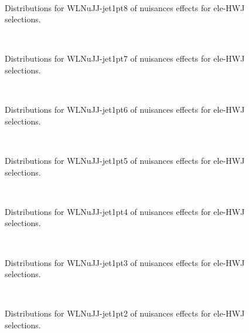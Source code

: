 \begin{figure}[htbp]  
\centering 
\\ 
\caption{ 
   Distributions for WLNuJJ-jet1pt8 of nuisances effects for ele-HWJ selections.
} 
\label{fig:WLNuJJ_jet1pt8_ele_HWJ} 
\end{figure} 




\begin{figure}[htbp]  
\centering 
\\ 
\caption{ 
   Distributions for WLNuJJ-jet1pt7 of nuisances effects for ele-HWJ selections.
} 
\label{fig:WLNuJJ_jet1pt7_ele_HWJ} 
\end{figure} 




\begin{figure}[htbp]  
\centering 
\\ 
\caption{ 
   Distributions for WLNuJJ-jet1pt6 of nuisances effects for ele-HWJ selections.
} 
\label{fig:WLNuJJ_jet1pt6_ele_HWJ} 
\end{figure} 




\begin{figure}[htbp]  
\centering 
\\ 
\caption{ 
   Distributions for WLNuJJ-jet1pt5 of nuisances effects for ele-HWJ selections.
} 
\label{fig:WLNuJJ_jet1pt5_ele_HWJ} 
\end{figure} 




\begin{figure}[htbp]  
\centering 
\\ 
\caption{ 
   Distributions for WLNuJJ-jet1pt4 of nuisances effects for ele-HWJ selections.
} 
\label{fig:WLNuJJ_jet1pt4_ele_HWJ} 
\end{figure} 




\begin{figure}[htbp]  
\centering 
\\ 
\caption{ 
   Distributions for WLNuJJ-jet1pt3 of nuisances effects for ele-HWJ selections.
} 
\label{fig:WLNuJJ_jet1pt3_ele_HWJ} 
\end{figure} 




\begin{figure}[htbp]  
\centering 
\\ 
\caption{ 
   Distributions for WLNuJJ-jet1pt2 of nuisances effects for ele-HWJ selections.
} 
\label{fig:WLNuJJ_jet1pt2_ele_HWJ} 
\end{figure} 




